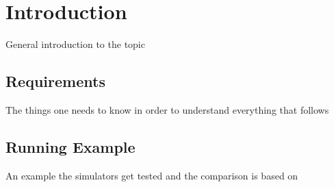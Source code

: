 \chapter{Introduction}

General introduction to the topic

\section{Requirements}

The things one needs to know in order to understand everything that follows

\section{Running Example}

An example the simulators get tested and the comparison is based on


